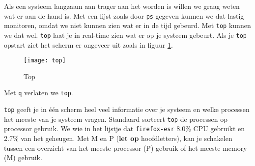 Als een systeem langzaam aan trager aan het worden is willen we graag weten wat er aan de hand is. Met een lijst zoals door \texttt{ps} gegeven kunnen we dat lastig monitoren, omdat we niet kunnen zien wat er in de tijd gebeurd. Met \texttt{top} kunnen we dat wel. \texttt{top} laat je in real-time zien wat er op je systeem gebeurt. Als je \texttt{top} opstart ziet het scherm er ongeveer uit zoals in figuur \ref{fig:top}.

\begin{figure}[H]
\texttt{[image: top]}
\centering
\caption{Top}
\label{fig:top}
\end{figure}
Met \texttt{q} verlaten we \texttt{top}.

\texttt{top} geeft je in \'e\'en scherm heel veel informatie over je systeem en welke processen het meeste van je systeem vragen. Standaard sorteert \texttt{top} de processen op processor gebruik. We wie in het lijstje dat \texttt{firefox-esr} 8.0\% CPU gebruikt en 2.7\% van het geheugen. Met M en P (\textbf{let op} hoofdletters), kan je schakelen tussen een overzicht van het meeste processor (P) gebruik of het meeste memory (M) gebruik.
